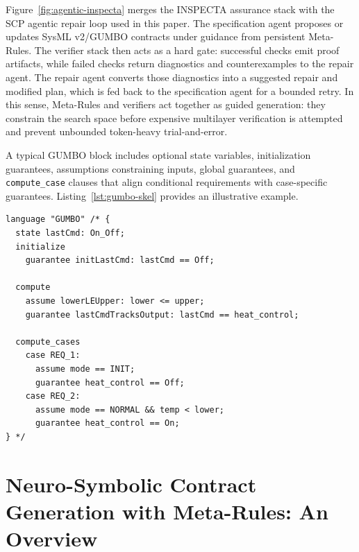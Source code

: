 \documentclass[conference]{IEEEtran}
\begin{document}
Figure~\ref{fig:agentic-inspecta} merges the INSPECTA assurance stack with the SCP agentic repair loop used in this paper. The specification agent proposes or updates SysML v2/GUMBO contracts under guidance from persistent Meta-Rules. The verifier stack then acts as a hard gate: successful checks emit proof artifacts, while failed checks return diagnostics and counterexamples to the repair agent. The repair agent converts those diagnostics into a suggested repair and modified plan, which is fed back to the specification agent for a bounded retry. In this sense, Meta-Rules and verifiers act together as guided generation: they constrain the search space before expensive multilayer verification is attempted and prevent unbounded token-heavy trial-and-error.


A typical GUMBO block includes optional state variables, initialization guarantees, assumptions constraining inputs, global guarantees, and \texttt{compute\_case} clauses that align conditional requirements with case-specific guarantees. Listing~\ref{lst:gumbo-skel} provides an illustrative example.

\begin{lstlisting}[caption={Illustrative skeleton of a GUMBO contract on a SysML v2 component.},label={lst:gumbo-skel}]
language "GUMBO" /* {
  state lastCmd: On_Off;
  initialize
    guarantee initLastCmd: lastCmd == Off;

  compute
    assume lowerLEUpper: lower <= upper;
    guarantee lastCmdTracksOutput: lastCmd == heat_control;

  compute_cases
    case REQ_1:
      assume mode == INIT;
      guarantee heat_control == Off;
    case REQ_2:
      assume mode == NORMAL && temp < lower;
      guarantee heat_control == On;
} */
\end{lstlisting}


\section{Neuro-Symbolic Contract Generation with Meta-Rules: An Overview}
\label{sec:approach}

\end{document}
